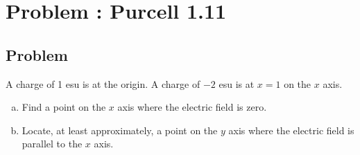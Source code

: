 \documentclass[solutions]{esg8022pset}
\begin{document}
\section{Problem \thesection: Purcell 1.11}
\subsection{Problem}
  A charge of 1 esu is at the origin. A charge of $-2$ esu is at $x = 1$ on the $x$ axis.
  \begin{enumerate}[(a)]
    \item Find a point on the $x$ axis where the electric field is zero.
    \item Locate, at least approximately, a point on the $y$ axis where the electric field is parallel to the $x$ axis.
  \end{enumerate}
\end{document}
